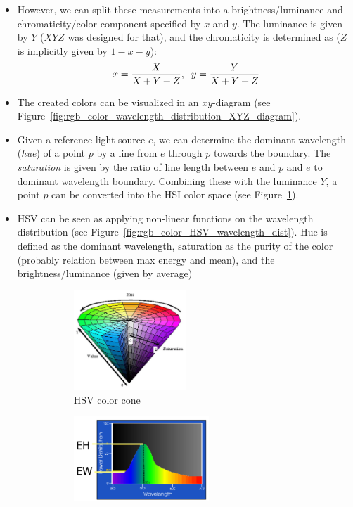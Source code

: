\begin{itemize}
	\item However, we can split these measurements into a brightness/luminance and chromaticity/color component specified by $x$ and $y$. The luminance is given by $Y$ ($XYZ$ was designed for that), and the chromaticity is determined as ($Z$ is implicitly given by $1-x-y$):
	$$x=\frac{X}{X+Y+Z},\hspace{2mm}y=\frac{Y}{X+Y+Z}$$
	\item The created colors can be visualized in an $xy$-diagram (see Figure~\ref{fig:rgb_color_wavelength_distribution_XYZ_diagram}). 
	\item Given a reference light source $e$, we can determine the dominant wavelength (\textit{hue}) of a point $p$ by a line from $e$ through $p$ towards the boundary. The \textit{saturation} is given by the ratio of line length between $e$ and $p$ and $e$ to dominant wavelength boundary. Combining these with the luminance $Y$, a point $p$ can be converted into the HSI color space (see Figure~\ref{fig:rgb_color_HSV_color_cone}).
	\item HSV can be seen as applying non-linear functions on the wavelength distribution (see Figure~\ref{fig:rgb_color_HSV_wavelength_dist}). Hue is defined as the dominant wavelength, saturation as the purity of the color (probably relation between max energy and mean), and the brightness/luminance (given by average)
	\begin{figure}[ht!]
		\centering
		\begin{subfigure}[b]{0.4\textwidth}
			\centering
			\includegraphics[width=0.5\textwidth]{figures/cv_image_formation_color_HSV.png}
			\caption{HSV color cone}
			\label{fig:rgb_color_HSV_color_cone}
		\end{subfigure}
		\begin{subfigure}[b]{0.4\textwidth}
			\centering
			\includegraphics[width=0.6\textwidth]{figures/cv_image_formation_color_HSV_wavelength_dist.png}

\end{subfigure}
\end{figure}
\end{itemize}
